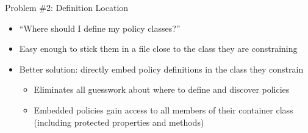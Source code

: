 \documentclass[aspectratio=169]{beamer}
\begin{document}
\begin{frame}
\end{frame}

\begin{frame}{Problem \#2: Definition Location}
  \begin{itemize}
    \setlength\itemsep{1em}
    \item ``Where should I define my policy classes?''
    \item Easy enough to stick them in a file close to the class they are constraining
    \item Better solution: directly embed policy definitions in the class they constrain
    \vspace{8pt}
    \begin{itemize}
      \setlength\itemsep{1em}
      \item Eliminates all guesswork about where to define and discover policies
      \item Embedded policies gain access to all members of their container class (including protected properties and methods)
    \end{itemize}
  \end{itemize}
\end{frame}
\end{document}

